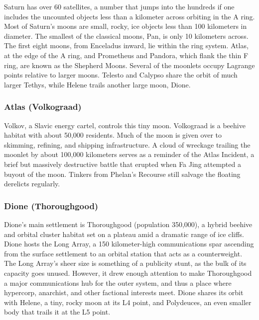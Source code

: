 Saturn has over 60 satellites, a number that jumps into the hundreds if one includes the uncounted objects less than a kilometer across orbiting in the A ring. Most of Saturn’s moons are small, rocky, ice objects less than 100 kilometers in diameter. The smallest of the classical moons, Pan, is only 10 kilometers across. The first eight moons, from Enceladus inward, lie within the ring system. Atlas, at the edge of the A ring, and Prometheus and Pandora, which flank the thin F ring, are known as the Shepherd Moons. Several of the moonlets occupy Lagrange points relative to larger moons. Telesto and Calypso share the orbit of much larger Tethys, while Helene trails another large moon, Dione. 

\subsubsection{Atlas (Volkograad)} \label{sec:atlas-volkograad} 

Volkov, a Slavic energy cartel, controls this tiny moon. Volkograad is a beehive habitat with about 50,000 residents. Much of the moon is given over to skimming, refining, and shipping infrastructure. A cloud of wreckage trailing the moonlet by about 100,000 kilometers serves as a reminder of the Atlas Incident, a brief but massively destructive battle that erupted when Fa Jing attempted a buyout of the moon. Tinkers from Phelan’s Recourse still salvage the floating derelicts regularly. 

\subsubsection{Dione (Thoroughgood)} \label{sec:dione-thoroughgood} 

Dione’s main settlement is Thoroughgood (population 350,000), a hybrid beehive and orbital cluster habitat set on a plateau amid a dramatic range of ice cliffs. Dione hosts the Long Array, a 150 kilometer-high communications spar ascending from the surface settlement to an orbital station that acts as a counterweight. The Long Array’s sheer size is something of a publicity stunt, as the bulk of its capacity goes unused. However, it drew enough attention to make Thoroughgood a major communications hub for the outer system, and thus a place where hypercorp, anarchist, and other factional interests meet. Dione shares its orbit with Helene, a tiny, rocky moon at its L4 point, and Polydeuces, an even smaller body that trails it at the L5 point. 

